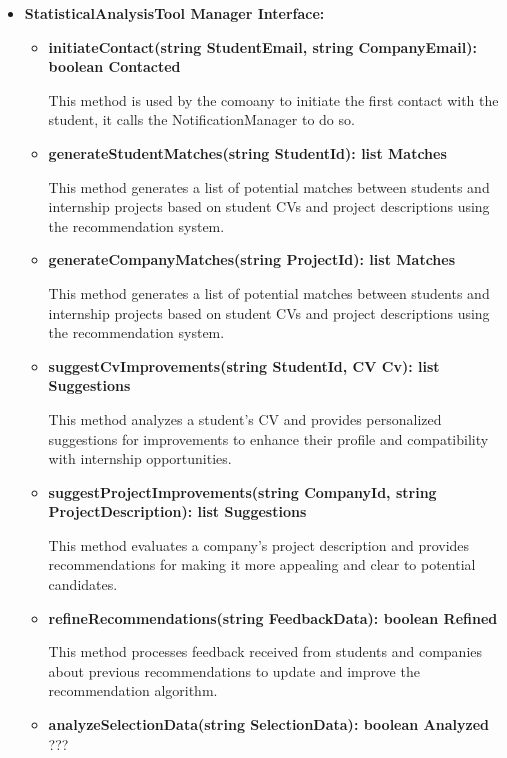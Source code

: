 \begin{itemize}
\begin{itemize}
\end{itemize}

\item \textbf{StatisticalAnalysisTool Manager Interface:}
\begin{itemize}

    \item \textbf{initiateContact(string StudentEmail, string CompanyEmail): boolean Contacted}

    This method is used by the comoany to initiate the first contact with the student, it calls the NotificationManager to do so.
    
    \item \textbf{generateStudentMatches(string StudentId): list Matches}

    This method generates a list of potential matches between students and internship projects based on student CVs and project descriptions using the recommendation system.

    \item \textbf{generateCompanyMatches(string ProjectId): list Matches}

    This method generates a list of potential matches between students and internship projects based on student CVs and project descriptions using the recommendation system.

    \item \textbf{suggestCvImprovements(string StudentId, CV Cv): list Suggestions}

    This method analyzes a student's CV and provides personalized suggestions for improvements to enhance their profile and compatibility with internship opportunities.

    \item \textbf{suggestProjectImprovements(string CompanyId, string ProjectDescription): list Suggestions}

    This method evaluates a company's project description and provides recommendations for making it more appealing and clear to potential candidates.

    \item \textbf{refineRecommendations(string FeedbackData): boolean Refined}

    This method processes feedback received from students and companies about previous recommendations to update and improve the recommendation algorithm.

    \item \textbf{analyzeSelectionData(string SelectionData): boolean Analyzed} ???


\end{itemize}
\end{itemize}
